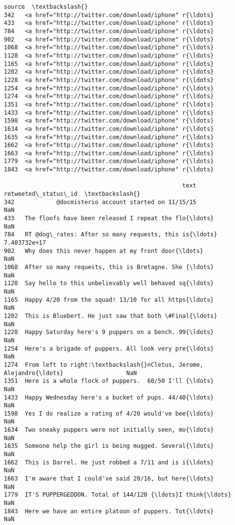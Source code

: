 \documentclass[11pt]{article}
\begin{document}
\begin{tcolorbox}[breakable, size=fbox, boxrule=.5pt, pad at break*=1mm, opacityfill=0]
\begin{Verbatim}[commandchars=\\\{\}]
                                                 source  \textbackslash{}
342   <a href="http://twitter.com/download/iphone" r{\ldots}
433   <a href="http://twitter.com/download/iphone" r{\ldots}
784   <a href="http://twitter.com/download/iphone" r{\ldots}
902   <a href="http://twitter.com/download/iphone" r{\ldots}
1068  <a href="http://twitter.com/download/iphone" r{\ldots}
1120  <a href="http://twitter.com/download/iphone" r{\ldots}
1165  <a href="http://twitter.com/download/iphone" r{\ldots}
1202  <a href="http://twitter.com/download/iphone" r{\ldots}
1228  <a href="http://twitter.com/download/iphone" r{\ldots}
1254  <a href="http://twitter.com/download/iphone" r{\ldots}
1274  <a href="http://twitter.com/download/iphone" r{\ldots}
1351  <a href="http://twitter.com/download/iphone" r{\ldots}
1433  <a href="http://twitter.com/download/iphone" r{\ldots}
1598  <a href="http://twitter.com/download/iphone" r{\ldots}
1634  <a href="http://twitter.com/download/iphone" r{\ldots}
1635  <a href="http://twitter.com/download/iphone" r{\ldots}
1662  <a href="http://twitter.com/download/iphone" r{\ldots}
1663  <a href="http://twitter.com/download/iphone" r{\ldots}
1779  <a href="http://twitter.com/download/iphone" r{\ldots}
1843  <a href="http://twitter.com/download/iphone" r{\ldots}

                                                   text  retweeted\_status\_id  \textbackslash{}
342            @docmisterio account started on 11/15/15                  NaN
433   The floofs have been released I repeat the flo{\ldots}                  NaN
784   RT @dog\_rates: After so many requests, this is{\ldots}         7.403732e+17
902   Why does this never happen at my front door{\ldots}                  NaN
1068  After so many requests, this is Bretagne. She {\ldots}                  NaN
1120  Say hello to this unbelievably well behaved sq{\ldots}                  NaN
1165  Happy 4/20 from the squad! 13/10 for all https{\ldots}                  NaN
1202  This is Bluebert. He just saw that both \#Final{\ldots}                  NaN
1228  Happy Saturday here's 9 puppers on a bench. 99{\ldots}                  NaN
1254  Here's a brigade of puppers. All look very pre{\ldots}                  NaN
1274  From left to right:\textbackslash{}nCletus, Jerome, Alejandro{\ldots}                  NaN
1351  Here is a whole flock of puppers.  60/50 I'll {\ldots}                  NaN
1433  Happy Wednesday here's a bucket of pups. 44/40{\ldots}                  NaN
1598  Yes I do realize a rating of 4/20 would've bee{\ldots}                  NaN
1634  Two sneaky puppers were not initially seen, mo{\ldots}                  NaN
1635  Someone help the girl is being mugged. Several{\ldots}                  NaN
1662  This is Darrel. He just robbed a 7/11 and is i{\ldots}                  NaN
1663  I'm aware that I could've said 20/16, but here{\ldots}                  NaN
1779  IT'S PUPPERGEDDON. Total of 144/120 {\ldots}I think{\ldots}                  NaN
1843  Here we have an entire platoon of puppers. Tot{\ldots}                  NaN


\end{Verbatim}
\end{tcolorbox}
\end{document}
